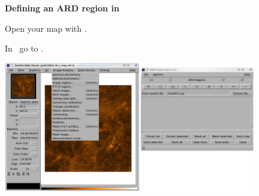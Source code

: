 \documentclass[11pt,oneside,chapters]{starlink}
\begin{document}
\begin{figure}[ht!]
\begin{center}
\begin{fmpage}{0.99\linewidth}
\vspace{0.2cm}
\hspace{0.2cm}
\textbf{Defining an ARD region in \gaia}

\vspace{0.5cm}
\hspace{0.1cm}
\begin{minipage}[c]{0.23\linewidth}
Open your map with \gaia.
\end{minipage}
\hspace{0.2cm}
\begin{minipage}[c]{0.72\linewidth}
\begin{terminalv}
\end{terminalv}
\end{minipage}

\begin{minipage}[c]{1.0\linewidth}
\end{minipage}

\vspace{0.5cm}
\hspace{0.1cm}
\begin{minipage}[c]{0.23\linewidth}
In \gaia\ go to .
\end{minipage}
\hspace{0.2cm}
\begin{minipage}[c]{0.72\linewidth}
\centering
\includegraphics[width=0.98\textwidth]{sc20_ard7}
\end{minipage}

\vspace{0.5cm}


\end{fmpage}
\end{center}
\end{figure}
\end{document}
